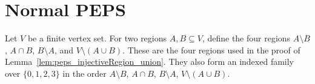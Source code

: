 \section{Normal PEPS}

\begin{definition}%
    \label{def:peps_regionUnionDecomposition}
    \leanok
    Let $V$ be a finite vertex set. For two regions $A,B\subseteq V$,
    define the four regions $A\setminus B$, $A\cap B$,
    $B\setminus A$, and $V\setminus(A\cup B)$. These are the four
    regions used in the proof of Lemma~\ref{lem:peps_injectiveRegion_union}.
    They also form an indexed family over $\{0,1,2,3\}$ in the order
    $A\setminus B$, $A\cap B$, $B\setminus A$, $V\setminus(A\cup B)$.
\end{definition}

